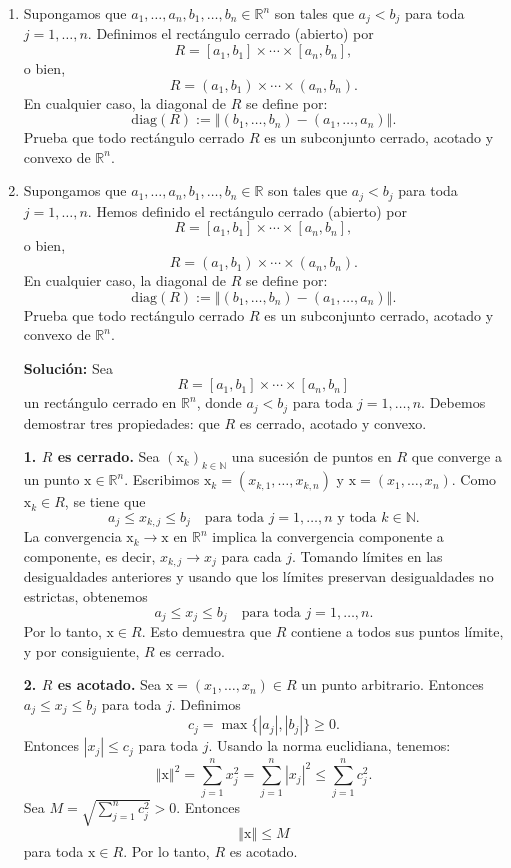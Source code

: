 \documentclass[12pt]{article}
\newcommand{\abs}[1]{\left\vert#1\right\vert}
\newcommand{\norm}[1]{\left\Vert#1\right\Vert}
\newcommand{\diag}{\mathrm{diag}}
\newcommand{\Int}{\mathrm{int}}
\newcommand{\N}{\mathbb N}
\newcommand{\R}{\mathbb R}
\newcommand{\x}{\mathrm x}
\begin{document}
\begin{enumerate}
Hemos llegado a una contradicción: por un lado, $\x \in \Int(\Omega)$, y por otro lado, $\x \notin \Int(\Omega)$. Por lo tanto, nuestra suposición inicial de que $\Int(\partial \Omega) \neq \emptyset$ debe ser falsa.

Concluimos que
\[
\Int(\partial \Omega) = \emptyset.
\]

\item Supongamos que $a_1,\ldots,a_n,b_1,\ldots,b_n\in \R^n$ son tales que $a_j<b_j$ para toda $j=1,\ldots,n$. Definimos el rectángulo cerrado (abierto) por
\[ R = [a_1,b_1]\times \cdots\times [a_n,b_n], \]
o bien,
\[ R = (a_1,b_1)\times \cdots\times (a_n,b_n). \]
En cualquier caso, la \textsf{diagonal} de $R$ se define por:
\[ \diag(R) := \norm{(b_1,\ldots,b_n) - (a_1,\ldots,a_n)}. \]
Prueba que todo rectángulo cerrado $R$ es un subconjunto cerrado, acotado y convexo de $\R^n$. 
\item Supongamos que $a_1,\ldots,a_n,b_1,\ldots,b_n\in \R$ son tales que $a_j<b_j$ para toda $j=1,\ldots,n$. Hemos definido el rectángulo cerrado (abierto) por
\[ R = [a_1,b_1]\times \cdots\times [a_n,b_n], \]
o bien,
\[ R = (a_1,b_1)\times \cdots\times (a_n,b_n). \]
En cualquier caso, la \textsf{diagonal} de $R$ se define por:
\[ \diag(R) := \norm{(b_1,\ldots,b_n) - (a_1,\ldots,a_n)}. \]
Prueba que todo rectángulo cerrado $R$ es un subconjunto cerrado, acotado y convexo de $\R^n$.

\textbf{Solución: } Sea
\[
R = [a_1,b_1]\times \cdots\times [a_n,b_n]
\]
un rectángulo cerrado en $\R^n$, donde $a_j < b_j$ para toda $j = 1, \ldots, n$. Debemos demostrar tres propiedades: que $R$ es cerrado, acotado y convexo.

\textbf{1. $R$ es cerrado.}
Sea $(\x_k)_{k \in \N}$ una sucesión de puntos en $R$ que converge a un punto $\x \in \R^n$. Escribimos $\x_k = (x_{k,1}, \ldots, x_{k,n})$ y $\x = (x_1, \ldots, x_n)$. Como $\x_k \in R$, se tiene que
\[
a_j \leq x_{k,j} \leq b_j \quad \text{para toda } j = 1, \ldots, n \text{ y toda } k \in \N.
\]
La convergencia $\x_k \to \x$ en $\R^n$ implica la convergencia componente a componente, es decir, $x_{k,j} \to x_j$ para cada $j$. Tomando límites en las desigualdades anteriores y usando que los límites preservan desigualdades no estrictas, obtenemos
\[
a_j \leq x_j \leq b_j \quad \text{para toda } j = 1, \ldots, n.
\]
Por lo tanto, $\x \in R$. Esto demuestra que $R$ contiene a todos sus puntos límite, y por consiguiente, $R$ es cerrado.

\textbf{2. $R$ es acotado.}
Sea $\x = (x_1, \ldots, x_n) \in R$ un punto arbitrario. Entonces $a_j \leq x_j \leq b_j$ para toda $j$. Definimos
\[
c_j = \max\{\abs{a_j}, \abs{b_j}\} \geq 0.
\]
Entonces $\abs{x_j} \leq c_j$ para toda $j$. Usando la norma euclidiana, tenemos:
\[
\norm{\x}^2 = \sum_{j=1}^{n} x_j^2 = \sum_{j=1}^{n} \abs{x_j}^2 \leq \sum_{j=1}^{n} c_j^2.
\]
Sea $M = \sqrt{\sum_{j=1}^{n} c_j^2} > 0$. Entonces
\[
\norm{\x} \leq M
\]
para toda $\x \in R$. Por lo tanto, $R$ es acotado.


\end{enumerate}
\end{document}
